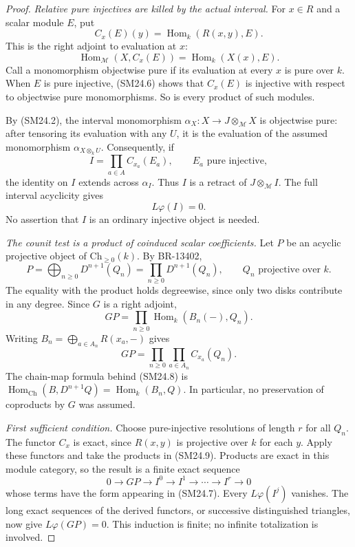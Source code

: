 \begin{proof}
\emph{Relative pure injectives are killed by the actual interval.}
For $x\in R$ and a scalar module $E$, put
\[
 C_x(E)(y)=\operatorname{Hom}_k(R(x,y),E).
 \tag{SM24.5}
\]
This is the right adjoint to evaluation at $x$:
\[
 \operatorname{Hom}_{\mathcal M}(X,C_x(E))
     =\operatorname{Hom}_k(X(x),E).
 \tag{SM24.6}
\]
Call a monomorphism objectwise pure if its evaluation at every
$x$ is pure over $k$. When $E$ is pure injective, (SM24.6)
shows that $C_x(E)$ is injective with respect to objectwise pure
monomorphisms. So is every product of such modules.

By (SM24.2), the interval monomorphism
$\alpha_X:X\to J\otimes_{\mathcal M}X$ is objectwise pure:
after tensoring its evaluation with any $U$, it is the evaluation
of the assumed monomorphism $\alpha_{X\otimes_k U}$.
Consequently, if
\[
 I=\prod_{a\in A} C_{x_a}(E_a),\qquad E_a\text{ pure injective},
\]
the identity on $I$ extends across $\alpha_I$.
Thus $I$ is a retract of $J\otimes_{\mathcal M}I$.
The full interval acyclicity gives
\[
 L\varphi(I)=0.
 \tag{SM24.7}
\]
No assertion that $I$ is an ordinary injective object is needed.

\emph{The counit test is a product of coinduced scalar coefficients.}
Let $P$ be an acyclic projective object of
$\mathrm{Ch}_{\geq0}(k)$. By BR-13402,
\[
 P=\bigoplus_{n\geq0}D^{n+1}(Q_n)
   =\prod_{n\geq0}D^{n+1}(Q_n),
 \qquad Q_n\text{ projective over }k.
\]
The equality with the product holds degreewise, since only two
disks contribute in any degree. Since $G$ is a right adjoint,
\[
 GP=\prod_{n\geq0}\operatorname{Hom}_k(B_n(-),Q_n).
 \tag{SM24.8}
\]
Writing $B_n=\bigoplus_{a\in A_n}R(x_a,-)$ gives
\[
 GP=\prod_{n\geq0}\prod_{a\in A_n} C_{x_a}(Q_n).
 \tag{SM24.9}
\]
The chain-map formula behind (SM24.8) is
$\operatorname{Hom}_{\mathrm{Ch}}(B,D^{n+1}Q)
=\operatorname{Hom}_k(B_n,Q)$.
In particular, no preservation of coproducts by $G$ was assumed.

\emph{First sufficient condition.}
Choose pure-injective resolutions of length $r$ for all $Q_n$.
The functor $C_x$ is exact, since $R(x,y)$ is projective over $k$
for each $y$. Apply these functors and take the products in
(SM24.9). Products are exact in this module category, so the
result is a finite exact sequence
\[
 0\longrightarrow GP\longrightarrow I^0\longrightarrow
       I^1\longrightarrow\cdots\longrightarrow I^r
       \longrightarrow0
\]
whose terms have the form appearing in (SM24.7).
Every $L\varphi(I^j)$ vanishes.
The long exact sequences of the derived functors, or successive
distinguished triangles, now give $L\varphi(GP)=0$.
This induction is finite; no infinite totalization is involved.


\end{proof}
